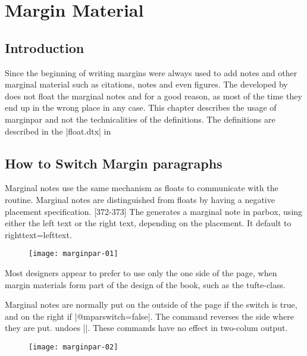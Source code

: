 \chapter{Margin Material}

\section{Introduction}

Since the beginning of writing margins were always used to add notes and other marginal material such as citations, notes and even figures. The  developed by \citeyearpar{marginnote} does not float the marginal
notes and for a good reason, as most of the time they end up in the wrong place in any case. This chapter describes
the usage of marginpar and not the technicalities of the definitions. The definitions are described in the |float.dtx| in 

\section{How to Switch Margin paragraphs}

Marginal notes use the same mechanism as floats to communicate with the \cmd{\output} routine.
Marginal notes are distinguished from floats by having a negative placement specification. [372-373] The \CMDI{\marginpar} generates a marginal note in parbox, using either the left 
text or the right text, depending on the placement. It default to righttext=lefttext. 

\begin{figure}
\texttt{[image: marginpar-01]}
\end{figure}

Most designers appear to prefer to use only the one side of the page, when margin materials form part of the design of the book, such as the tufte-class. 

Marginal notes are normally put on the outside of the page if the switch \CMDI{\@mparswitch} is true, and on the right if |@mparswitch=false|. The command \CMDI{\reversemarginpar} reverses the side where they are put. \CMDI{\normalmarginpar} undoes |\reversemarginpar|. These commands have no effect in two-colum output.


\begin{figure}
\texttt{[image: marginpar-02]}
\end{figure}


\lipsum